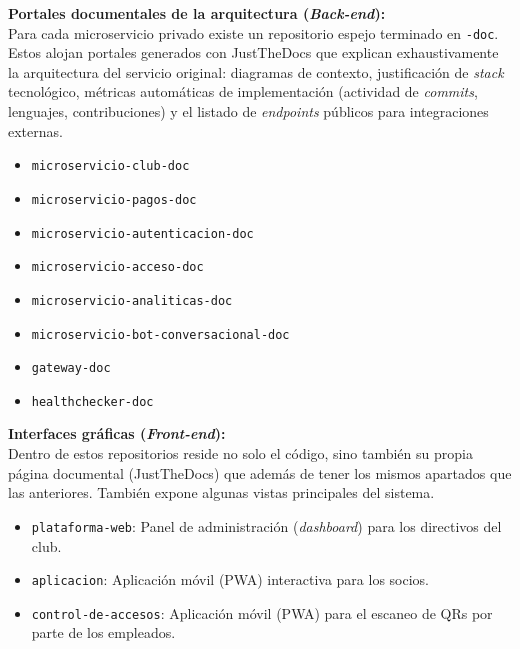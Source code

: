 \textbf{Portales documentales de la arquitectura (\textit{Back-end}):} \\
Para cada microservicio privado existe un repositorio espejo terminado en \texttt{-doc}. Estos alojan portales generados con JustTheDocs que explican exhaustivamente la arquitectura del servicio original: diagramas de contexto, justificación de \textit{stack} tecnológico, métricas automáticas de implementación (actividad de \textit{commits}, lenguajes, contribuciones) y el listado de \textit{endpoints} públicos para integraciones externas.
\begin{itemize}
    \item \texttt{microservicio-club-doc}
    \item \texttt{microservicio-pagos-doc}
    \item \texttt{microservicio-autenticacion-doc}
    \item \texttt{microservicio-acceso-doc}
    \item \texttt{microservicio-analiticas-doc}
    \item \texttt{microservicio-bot-conversacional-doc}
    \item \texttt{gateway-doc}
    \item \texttt{healthchecker-doc}
\end{itemize}

\textbf{Interfaces gráficas (\textit{Front-end}):} \\
Dentro de estos repositorios reside no solo el código, sino también su propia página documental (JustTheDocs) que además de tener los mismos apartados que las anteriores. También expone algunas vistas principales del sistema.
\begin{itemize}
    \item \texttt{plataforma-web}: Panel de administración (\textit{dashboard}) para los directivos del club.
    \item \texttt{aplicacion}: Aplicación móvil (PWA) interactiva para los socios.
    \item \texttt{control-de-accesos}: Aplicación móvil (PWA) para el escaneo de QRs por parte de los empleados.
\end{itemize}


